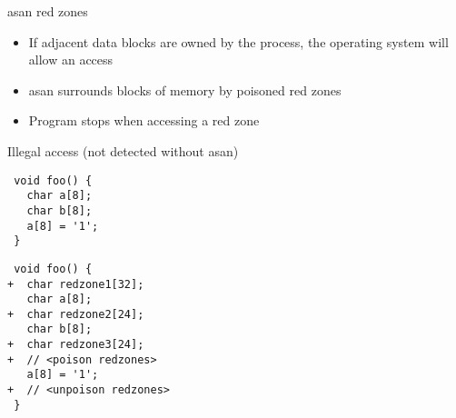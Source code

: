 \begin{frame}[fragile]
  \begin{block}{asan red zones}
    \begin{itemize}
      \item If adjacent data blocks are owned by the process, the operating system will allow an access
      \item<2> asan surrounds blocks of memory by poisoned red zones
      \item<2> Program stops when accessing a red zone
    \end{itemize}
  \end{block}
  \begin{exampleblock}{Illegal access (not detected without asan)}
    \begin{multicols}{2}
      \begin{overprint}
        \begin{verbatim}
 void foo() {
   char a[8];
   char b[8];
   a[8] = '1';
 }
        \end{verbatim}
        \begin{verbatim}
 void foo() {
+  char redzone1[32];
   char a[8];
+  char redzone2[24];
   char b[8];
+  char redzone3[24];
+  // <poison redzones>
   a[8] = '1';
+  // <unpoison redzones>
 }
        \end{verbatim}
      \end{overprint}
      \columnbreak
    \end{multicols}
    \vspace{1mm}
  \end{exampleblock}
\end{frame}

